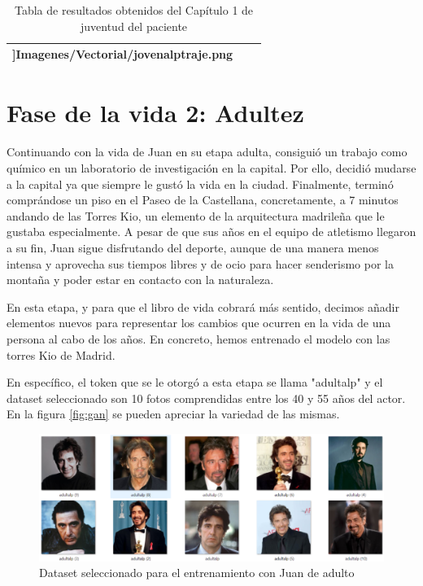 \begin{table}
\begin{tabular}{>{\centering\arraybackslash}m{5cm} >{\arraybackslash}m{5cm}>{\arraybackslash}m{5cm}}
 		\textwidth]{Imagenes/Vectorial/jovenalptraje.png}\\
 		\hline
 	\end{tabular}
 	\caption{Tabla de resultados obtenidos del Capítulo 1 de juventud del paciente}
 	\label{tab:capitulo1librovida}
 \end{table}


\section{Fase de la vida 2: Adultez}
Continuando con la vida de Juan en su etapa adulta, consiguió un trabajo como químico en un laboratorio de investigación en la capital. Por ello, decidió mudarse a la capital ya que siempre le gustó la vida en la ciudad. Finalmente, terminó comprándose un piso en el Paseo de la Castellana, concretamente, a 7 minutos andando de las Torres Kio, un elemento de la arquitectura madrileña que le gustaba especialmente. A pesar de que sus años en el equipo de atletismo llegaron a su fin, Juan sigue disfrutando del deporte, aunque de una manera menos intensa y aprovecha sus tiempos libres y de ocio para hacer senderismo por la montaña y poder estar en contacto con la naturaleza. 

En esta etapa, y para que el libro de vida cobrará más sentido, decimos añadir elementos nuevos para representar los cambios que ocurren en la vida de una persona al cabo de los años. En concreto, hemos entrenado el modelo con las torres Kio de Madrid.

En específico, el token que se le otorgó a esta etapa se llama "adultalp" y el dataset seleccionado son 10 fotos comprendidas entre los 40 y 55 años del actor. En la figura \ref{fig:gan} se pueden apreciar la variedad de las mismas. 

\begin{figure}[!htb]
	\centering
	\includegraphics[width = 1
	\textwidth]{Imagenes/Vectorial/dataset_adultalp.png}
	\caption{Dataset seleccionado para el entrenamiento con Juan de adulto}
	\label{fig:datasetadultalp}
\end{figure}

